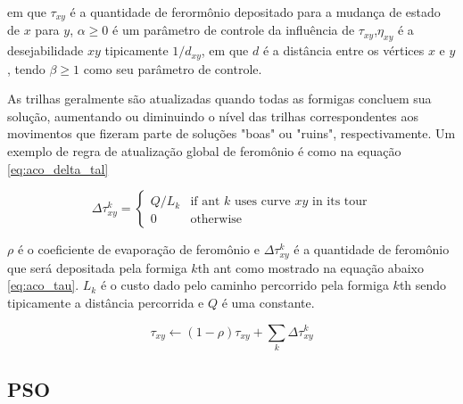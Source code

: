 em que $\tau _{xy}$ é a quantidade de ferormônio depositado para a mudança de estado de $x$ para $y$, $\alpha \geq 0$  é um parâmetro de controle da influência de $\tau _{xy}$,$\eta _{xy}$ é a desejabilidade $xy$ tipicamente $1/d_{{xy}}$, em que $d$ é a distância entre os vértices $\textit{x}$ e $\textit{y}$, tendo $\beta  \geq 1$ como seu parâmetro de controle.

As trilhas geralmente são atualizadas quando todas as formigas concluem sua solução, aumentando ou diminuindo o nível das trilhas correspondentes aos movimentos que fizeram parte de soluções "boas" ou "ruins", respectivamente. Um exemplo de regra de atualização global de feromônio é como na equação \ref{eq:aco_delta_tal}

\begin{equation}
\label{eq:aco_delta_tal}
    \Delta{\tau^{k}_{xy}} =
    \begin{cases}
    Q/L_k & \mbox{if ant }k\mbox{ uses curve }xy\mbox{ in its tour} \\
    0 & \mbox{otherwise}
    \end{cases}
\end{equation}

$\rho$ é o coeficiente de evaporação de feromônio e $\Delta \tau _{xy}^{k}$ é a quantidade de feromônio que será depositada pela formiga $k$th ant como mostrado na equação abaixo \ref{eq:aco_tau}. $L_{k}$ é o custo dado pelo caminho percorrido pela formiga $k$th sendo tipicamente a distância percorrida e $Q$ é uma constante.

\begin{equation}
\label{eq:aco_tau}
    \tau_{xy} \leftarrow
    (1-\rho)\tau_{xy} + \sum_{k}\Delta \tau^{k}_{xy}
\end{equation}

\subsection{PSO}

